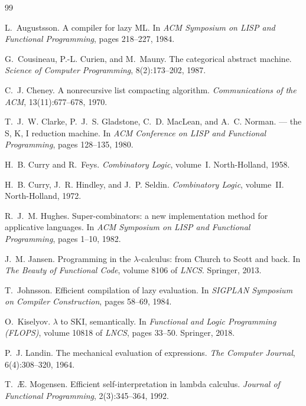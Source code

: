 \documentclass[11pt,a4paper]{article}
\theoremstyle{definition}
\theoremstyle{plain}
\begin{document}
\begin{thebibliography}{99}
\small

L.~Augustsson.
\newblock A compiler for lazy {ML}.
\newblock In \emph{ACM Symposium on LISP and Functional Programming}, pages
  218--227, 1984.

G.~Cousineau, P.-L. Curien, and M.~Mauny.
\newblock The categorical abstract machine.
\newblock \emph{Science of Computer Programming}, 8(2):173--202, 1987.

C.~J. Cheney.
\newblock A nonrecursive list compacting algorithm.
\newblock \emph{Communications of the ACM}, 13(11):677--678, 1970.

T.~J.~W. Clarke, P.~J.~S. Gladstone, C.~D. MacLean, and A.~C. Norman.
 --- the {S}, {K}, {I} reduction machine.
\newblock In \emph{ACM Conference on LISP and Functional Programming}, pages
  128--135, 1980.

H.~B. Curry and R.~Feys.
\newblock \emph{Combinatory Logic}, volume~I.
\newblock North-Holland, 1958.

H.~B. Curry, J.~R. Hindley, and J.~P. Seldin.
\newblock \emph{Combinatory Logic}, volume~II.
\newblock North-Holland, 1972.

R.~J.~M. Hughes.
\newblock Super-combinators: a new implementation method for applicative
  languages.
\newblock In \emph{ACM Symposium on LISP and Functional Programming}, pages
  1--10, 1982.

J.~M. Jansen.
\newblock Programming in the $\lambda$-calculus: from {C}hurch to {S}cott and
  back.
\newblock In \emph{The Beauty of Functional Code}, volume 8106 of
  \emph{LNCS}. Springer, 2013.

T.~Johnsson.
\newblock Efficient compilation of lazy evaluation.
\newblock In \emph{SIGPLAN Symposium on Compiler Construction}, pages 58--69,
  1984.

O.~Kiselyov.
\newblock $\lambda$ to {SKI}, semantically.
\newblock In \emph{Functional and Logic Programming (FLOPS)}, volume 10818 of
  \emph{LNCS}, pages 33--50. Springer, 2018.

P.~J. Landin.
\newblock The mechanical evaluation of expressions.
\newblock \emph{The Computer Journal}, 6(4):308--320, 1964.

T.~{\AE}. Mogensen.
\newblock Efficient self-interpretation in lambda calculus.
\newblock \emph{Journal of Functional Programming}, 2(3):345--364, 1992.


\end{thebibliography}
\end{document}
